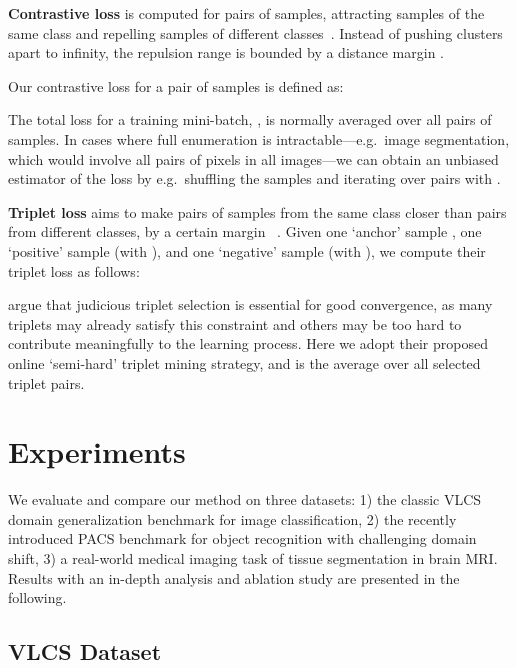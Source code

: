 \documentclass{article}
\newcommand{\changed}[1]{\textcolor{red}{#1}}
\begin{document}
\vspace{1mm}

\textbf{Contrastive loss}
is computed for pairs of samples, attracting samples of the same class and repelling samples of different classes~\citep{hadsell2006dimensionality}. Instead of pushing clusters apart to infinity, the repulsion range is bounded by a distance margin . 

Our contrastive loss for a pair of samples  is defined as:


The total loss for a training mini-batch, , is normally averaged over all pairs of samples. In cases where full  enumeration is intractable---e.g.\ image segmentation, which would involve all pairs of pixels in all images---we can obtain an unbiased  estimator of the loss by e.g.\ shuffling the samples and iterating over  pairs with .
\changed{}



\vspace{1mm}

\textbf{Triplet loss} aims to make pairs of samples from the same class closer than pairs from different classes, by a certain margin ~\citep{schroff2015facenet}. Given one `anchor' sample , one `positive' sample  (with ), and one `negative' sample  (with ), we compute their triplet loss as follows:


 argue that judicious triplet selection is essential for good convergence, as many triplets may already satisfy this constraint and others may be too hard to contribute meaningfully to the learning process. Here we adopt their proposed online `semi-hard' triplet mining strategy, and  is the average over all selected triplet pairs.
 
\section{Experiments}

We evaluate and compare our method on three datasets: 1) the classic VLCS domain generalization benchmark for image classification, 2) the recently introduced PACS benchmark for object recognition with challenging domain shift, 3) a real-world medical imaging task of tissue segmentation in brain MRI. Results with an in-depth analysis and ablation study are presented in the following.

\subsection{VLCS Dataset}
\end{document}
